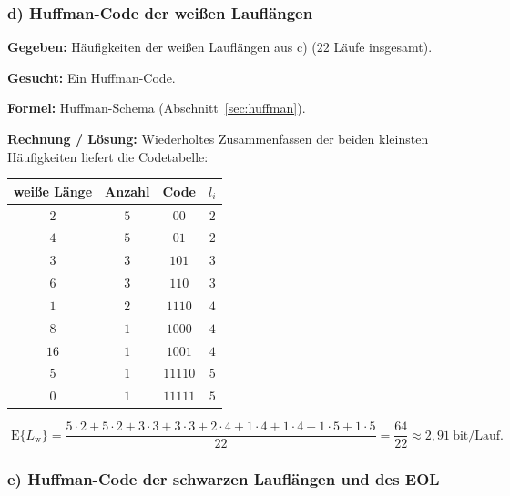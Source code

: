 \subsubsection*{d) Huffman-Code der weißen Lauflängen}

\begin{beispiel}

\textbf{Gegeben:} Häufigkeiten der weißen Lauflängen aus c)
($22$ Läufe insgesamt).

\textbf{Gesucht:} Ein Huffman-Code.

\textbf{Formel:} Huffman-Schema (Abschnitt~\ref{sec:huffman}).

\textbf{Rechnung / Lösung:} Wiederholtes Zusammenfassen der beiden kleinsten
Häufigkeiten liefert die Codetabelle:

\begin{center}
\begin{tabular}{c|c|c|c}
weiße Länge & Anzahl & Code & $l_i$ \\ \hline
$2$  & $5$ & $00$    & $2$ \\
$4$  & $5$ & $01$    & $2$ \\
$3$  & $3$ & $101$   & $3$ \\
$6$  & $3$ & $110$   & $3$ \\
$1$  & $2$ & $1110$  & $4$ \\
$8$  & $1$ & $1000$  & $4$ \\
$16$ & $1$ & $1001$  & $4$ \\
$5$  & $1$ & $11110$ & $5$ \\
$0$  & $1$ & $11111$ & $5$ \\
\end{tabular}
\end{center}

$$
\boxed{\;\mathrm{E}\{L_{\text{w}}\}
= \frac{5\cdot 2 + 5\cdot 2 + 3\cdot 3 + 3\cdot 3 + 2\cdot 4 + 1\cdot 4
+ 1\cdot 4 + 1\cdot 5 + 1\cdot 5}{22}
= \frac{64}{22} \approx 2{,}91\ \text{bit/Lauf}.\;}
$$

\end{beispiel}

\subsubsection*{e) Huffman-Code der schwarzen Lauflängen und des EOL}

